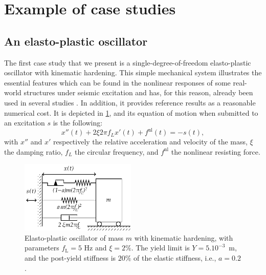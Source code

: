 



\section{Example of case studies}\label{sec:intro-frags:casstudies}

    \subsection{An elasto-plastic oscillator}\label{sec:intro-frags:elastoplastic}

    The first case study that we present is 
    a single-degree-of-freedom elasto-plastic oscillator with kinematic hardening.
    This simple mechanical system illustrates the essential features which can be found in the nonlinear responses of some real-world structures under seismic excitation and has, for this reason, already been used in several studies \citep{trevlopoulos_parametric_2019,sainct_efficient_2020,gauchy_importance_2021}.
    In addition, it provides reference results as a reasonable numerical cost.
    It is depicted in \cref{fig:intro-frags:elasto}, and
    its equation of motion when submitted to an excitation $s$ is the following:
    \begin{equation}
        x''(t) +2\xi2\pi f_L x'(t)+f^{\text{nl}}(t) = -s(t),
    \end{equation}
    with $x''$ and $x'$ respectively the relative  acceleration and velocity of the mass,  $\xi$ the damping ratio, $f_L$ the circular frequency, and $f^{\text{nl}}$ the nonlinear resisting force.

    \begin{figure}[h]
        \centering
        \includegraphics[width=5.5cm]{figures/intro-frags/KBEPO_rheo.pdf}
        \caption{Elasto-plastic oscillator of mass $m$ with kinematic hardening, with parameters $f_{\text{L}} = 5$ Hz and $\xi = 2\%$. The yield limit is $Y = 5.10^{-3}$~m, and the post-yield stiffness is $20\%$ of the elastic stiffness, i.e., $a = 0.2$.} 
        \label{fig:intro-frags:elasto}  
    \end{figure}

